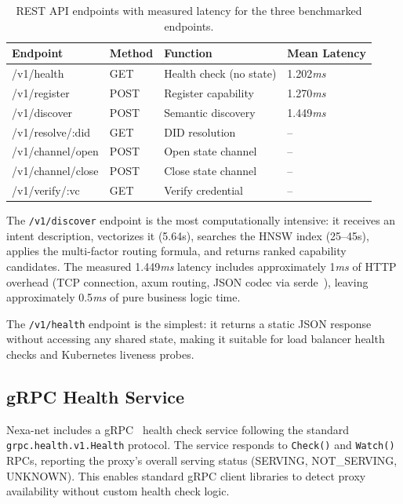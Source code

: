 \begin{table}[h]
\centering
\begin{tabular}{@{}llll@{}}
\toprule
Endpoint & Method & Function & Mean Latency \\
\midrule
/v1/health & GET & Health check (no state) & 1.202\textit{ms} \\
/v1/register & POST & Register capability & 1.270\textit{ms} \\
/v1/discover & POST & Semantic discovery & 1.449\textit{ms} \\
/v1/resolve/:did & GET & DID resolution & -- \\
/v1/channel/open & POST & Open state channel & -- \\
/v1/channel/close & POST & Close state channel & -- \\
/v1/verify/:vc & GET & Verify credential & -- \\
\bottomrule
\end{tabular}
\caption{REST API endpoints with measured latency for the three benchmarked endpoints.}
\label{tab:rest-api}
\end{table}

The \texttt{/v1/discover} endpoint is the most computationally intensive: it receives an intent description, vectorizes it (5.64\textmu s), searches the HNSW index (25--45\textmu s), applies the multi-factor routing formula, and returns ranked capability candidates. The measured 1.449\textit{ms} latency includes approximately 1\textit{ms} of HTTP overhead (TCP connection, axum routing, JSON codec via serde~\cite{serde2022}), leaving approximately 0.5\textit{ms} of pure business logic time.

The \texttt{/v1/health} endpoint is the simplest: it returns a static JSON response without accessing any shared state, making it suitable for load balancer health checks and Kubernetes liveness probes.

\subsection{gRPC Health Service}

Nexa-net includes a gRPC~\cite{grpc2015} health check service following the standard \texttt{grpc.health.v1.Health} protocol. The service responds to \texttt{Check()} and \texttt{Watch()} RPCs, reporting the proxy's overall serving status (SERVING, NOT\_SERVING, UNKNOWN). This enables standard gRPC client libraries to detect proxy availability without custom health check logic.

